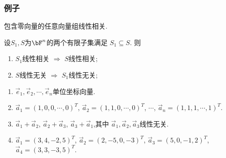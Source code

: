 \begin{frame}\frametitle{例子}

\begin{example}
包含零向量的任意向量组线性相关.
\end{example}
\pp

\begin{example}
设$S_1,S$为$\bF^n$的两个有限子集满足 $S_1\subseteq S$.
\pp
则
\begin{enumerate}
\item $S_1$线性相关 $\Rightarrow$ $S$线性相关;
\pp
\item $S$线性无关 $\Rightarrow$ $S_1$线性无关;
\end{enumerate}
\end{example}

\pp
\begin{example}[判定下列向量组的线性相关性]
\begin{enumerate}
\item $\vec{e}_1,\vec{e}_2,\cdots,\vec{e}_n$单位坐标向量.
\pp
\item $\vec{a}_1=(1,0,0,\cdots,0)^T$, $\vec{a}_2=(1,1,0,\cdots,0)^T$, $\cdots$, $\vec{a}_n=(1,1,1,\cdots,1)^T$.
\pp
\item $\vec{a}_1+\vec{a}_2$, $\vec{a}_2+\vec{a}_3$, $\vec{a}_3+\vec{a}_1$,其中 $\vec{a}_1,\vec{a}_2,\vec{a}_3$线性无关.
\pp
\item $\vec{a}_1=(3,4,-2,5)^T$, $\vec{a}_2=(2,-5,0,-3)^T$, $\vec{a}_3=(5,0,-1,2)^T$, $\vec{a}_4=(3,3,-3,5)^T$.
\end{enumerate}
\end{example}
\end{frame}






